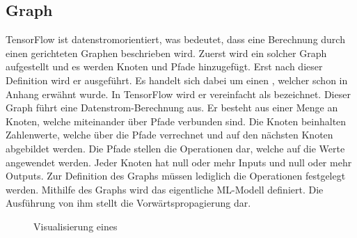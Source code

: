 \subsection{Graph}
TensorFlow ist datenstromorientiert, was bedeutet, dass eine Berechnung
durch einen gerichteten Graphen beschrieben wird. Zuerst wird ein solcher Graph
aufgestellt und es werden Knoten und Pfade hinzugefügt. Erst nach dieser
Definition wird er ausgeführt.
Es handelt sich dabei um einen , welcher schon in
Anhang  erwähnt wurde.
In TensorFlow wird er vereinfacht als  bezeichnet.
\para{}
Dieser Graph führt eine Datenstrom-Berechnung aus.
Er besteht aus einer Menge an Knoten, welche miteinander über Pfade
verbunden sind. Die Knoten beinhalten Zahlenwerte, welche über die Pfade
verrechnet und auf den nächsten Knoten abgebildet werden.
Die Pfade stellen die Operationen dar, welche auf die Werte
angewendet werden. Jeder Knoten hat null oder mehr Inputs und null oder mehr Outputs.
Zur Definition des Graphs müssen lediglich die Operationen festgelegt werden.
\para{}
Mithilfe des Graphs wird das eigentliche ML-Modell definiert. Die Ausführung von
ihm stellt die Vorwärtspropagierung dar.
\para{}

\begin{figure}[h!]
  \caption{Visualisierung eines }
\end{figure}

